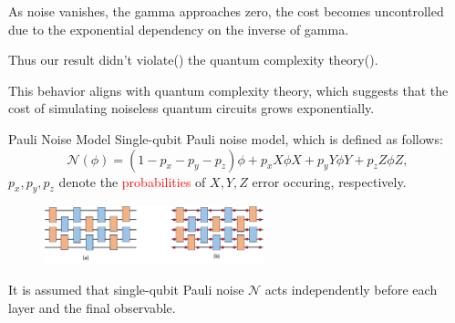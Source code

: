 \documentclass[10pt]{beamer}
\begin{document}
\begin{CJK}{UTF8}{gbsn}
{  %

  
  As noise vanishes, the gamma approaches zero, the cost becomes uncontrolled due to the exponential dependency on the inverse of gamma.

  Thus our result didn't violate() the quantum complexity theory().

  This behavior aligns with quantum complexity theory, which suggests that the cost of simulating noiseless quantum circuits grows exponentially.
}





\begin{frame}[fragile]{Pauli Noise Model}
 Single-qubit Pauli noise model, which is defined as follows:
\begin{equation}\label{eq:single_qubit_noise}
\mathcal{N}(\phi)=(1-p_x-p_y-p_z)\phi+ p_x X\phi X+ p_y Y\phi Y+ p_z Z\phi Z,
\end{equation}
$p_x,p_y,p_z$ denote the \textcolor{red}{probabilities} of $X,Y,Z$ error occuring, respectively. 


\begin{figure}[tbp]
  \includegraphics[width=240px]{fig/Circuit_comb.pdf}
\end{figure}
It is assumed that single-qubit Pauli noise $\mathcal{N}$ acts independently before each layer and the final observable.
\vspace{1em}
\end{frame}
\end{CJK}
\end{document}
